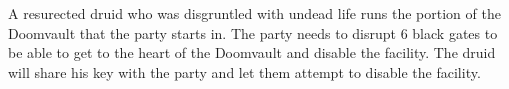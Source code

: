A resurected druid who was disgruntled with undead life runs the portion of the Doomvault that the party starts in.
The party needs to disrupt 6 black gates to be able to get to the heart of the Doomvault and disable the facility.
The druid will share his key with the party and let them attempt to disable the facility.
